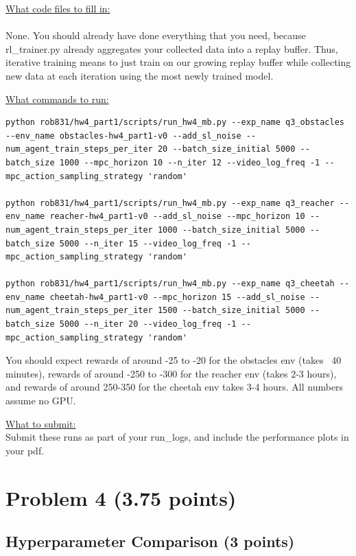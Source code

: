 \documentclass{article} %
\begin{document}
\underline{What code files to fill in:}\\ \\
None. You should already have done everything that you need, because rl\_trainer.py already aggregates your collected data into a replay buffer. Thus, iterative training means to just train on our growing replay buffer while collecting new data at each iteration using the most newly trained model.

\underline{What commands to run:}
\begin{lstlisting}[escapechar=@]
python rob831/hw4_part1/scripts/run_hw4_mb.py --exp_name q3_obstacles --env_name obstacles-hw4_part1-v0 --add_sl_noise --num_agent_train_steps_per_iter 20 --batch_size_initial 5000 --batch_size 1000 --mpc_horizon 10 --n_iter 12 --video_log_freq -1 --mpc_action_sampling_strategy 'random'

python rob831/hw4_part1/scripts/run_hw4_mb.py --exp_name q3_reacher --env_name reacher-hw4_part1-v0 --add_sl_noise --mpc_horizon 10 --num_agent_train_steps_per_iter 1000 --batch_size_initial 5000 --batch_size 5000 --n_iter 15 --video_log_freq -1 --mpc_action_sampling_strategy 'random'

python rob831/hw4_part1/scripts/run_hw4_mb.py --exp_name q3_cheetah --env_name cheetah-hw4_part1-v0 --mpc_horizon 15 --add_sl_noise --num_agent_train_steps_per_iter 1500 --batch_size_initial 5000 --batch_size 5000 --n_iter 20 --video_log_freq -1 --mpc_action_sampling_strategy 'random'
\end{lstlisting}

You should expect rewards of around -25 to -20 for the obstacles env (takes ~40 minutes), rewards of around -250 to -300 for the reacher env (takes 2-3 hours), and rewards of around 250-350 for the cheetah env {takes 3-4 hours}. All numbers assume no GPU.

\underline{What to submit:}\\
Submit these runs as part of your run\_logs, and include the performance plots in your pdf.








\newpage
\section*{Problem 4 (3.75 points)}

\subsection*{Hyperparameter Comparison (3 points)}
\end{document}
